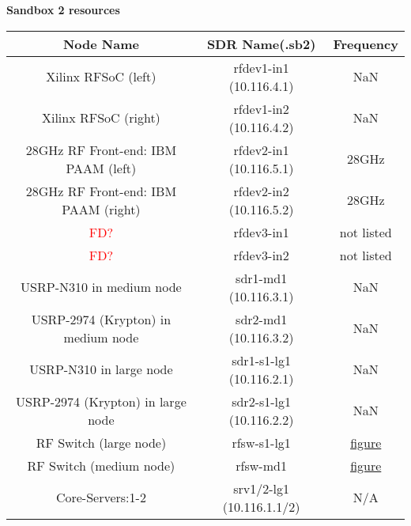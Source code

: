 \documentclass{article}
\begin{document}
    \newpage
    \textbf{Sandbox 2 resources}
    \begin{center}
        \begin{tabular}{||c c c||} 
            \hline
            \textbf{Node Name} & \textbf{SDR Name(.sb2)} & Frequency\\ [0.5ex] 
            \hline\hline
            Xilinx RFSoC (left) & rfdev1-in1 (10.116.4.1) & NaN \\
            \hline
            Xilinx RFSoC (right) & rfdev1-in2 (10.116.4.2) & NaN \\
            \hline
            28GHz RF Front-end: IBM PAAM (left) & rfdev2-in1 (10.116.5.1) & 28GHz \\
            \hline
            28GHz RF Front-end: IBM PAAM (right) & rfdev2-in2 (10.116.5.2) & 28GHz \\
            \hline
            \textcolor{red}{FD?} & rfdev3-in1 & not listed \\
            \hline
            \textcolor{red}{FD?} & rfdev3-in2 & not listed \\
            \hline
            USRP-N310 in medium node & sdr1-md1 (10.116.3.1) & NaN \\
            \hline
            USRP-2974 (Krypton) in medium node & sdr2-md1 (10.116.3.2) & NaN \\
            \hline
            USRP-N310 in large node & sdr1-s1-lg1 (10.116.2.1) & NaN \\
            \hline
            USRP-2974 (Krypton) in large node & sdr2-s1-lg1 (10.116.2.2) & NaN \\
            \hline
            RF Switch (large node) & rfsw-s1-lg1 & \href{https://wiki.cosmos-lab.org/attachment/wiki/Architecture/Domains/cosmos_sb2/SB2-BD.png}{figure} \\
            \hline
            RF Switch (medium node) & rfsw-md1 & \href{https://wiki.cosmos-lab.org/attachment/wiki/Architecture/Domains/cosmos_sb2/SB2-BD.png}{figure} \\
            \hline
            Core-Servers:1-2 & srv1/2-lg1 (10.116.1.1/2) & N/A \\ [1ex] 
            \hline
        \end{tabular}
    \end{center}
    
\end{document}
